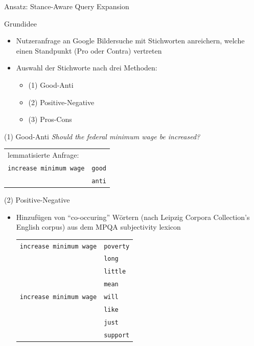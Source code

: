 \documentclass[usenames,dvipsnames]{beamer}
\begin{document}
	\begin{section}{Ansatz: Stance-Aware Query Expansion}
	\begin{frame}{Grundidee}
		\begin{itemize}
			\item Nutzeranfrage an Google Bildersuche mit Stichworten anreichern, welche einen Standpunkt (Pro oder Contra) vertreten
			\item Auswahl der Stichworte nach drei Methoden:
				\begin{itemize}
					\item (1) Good-Anti
					\item (2) Positive-Negative
					\item (3) Pros-Cons
				\end{itemize}

		\end{itemize}
	\end{frame}

	\begin{frame}{(1) Good-Anti}
		\centering
		\large \textit{Should the federal minimum wage be increased?} \normalsize
		\vspace{2em}
		\begin{tcolorbox}
			\begin{tabular}{l l}
				lemmatisierte Anfrage: \\
				\texttt{increase minimum wage} & \texttt{\color{JungleGreen}good} \\
																			 & \texttt{\color{RubineRed}anti}
			\end{tabular}
		\end{tcolorbox}
\end{frame}
	
\begin{frame}{(2) Positive-Negative}
	\begin{itemize}
		\item Hinzufügen von \enquote{co-occuring} Wörtern (nach Leipzig Corpora Collection's English corpus) aus dem MPQA subjectivity lexicon
		\vspace{1em}
		\begin{tcolorbox}
			\begin{tabular}{l l}
				\texttt{increase minimum wage} & \texttt{\color{RubineRed}poverty} \\
																			 & \texttt{\color{RubineRed}long} \\
																			 & \texttt{\color{RubineRed}little} \\
																			 & \texttt{\color{RubineRed}mean} \\
				\texttt{increase minimum wage} & \texttt{\color{JungleGreen}will} \\
																			 & \texttt{\color{JungleGreen}like} \\
																			 & \texttt{\color{JungleGreen}just} \\
																			 & \texttt{\color{JungleGreen}support} \\
			\end{tabular}
		\end{tcolorbox}
	\end{itemize}
\end{frame}


\end{section}
\end{document}
